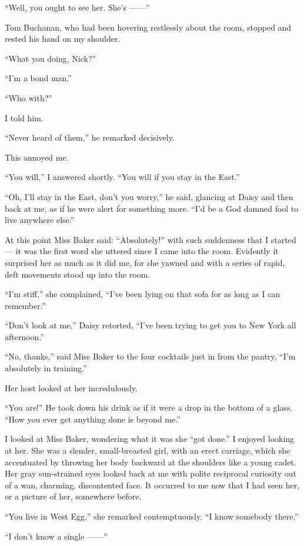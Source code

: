 \documentclass{znotebook}
\begin{document}
``Well, you ought to see her. She’s ——''

Tom Buchanan, who had been hovering restlessly about the room, stopped and rested his hand on my shoulder.

``What you doing, Nick?''

``I’m a bond man.''

``Who with?''

I told him.

``Never heard of them,'' he remarked decisively.

This annoyed me.

``You will,'' I answered shortly. ``You will if you stay in the East.''

``Oh, I’ll stay in the East, don’t you worry,'' he said, glancing at Daisy and then back at me, as if he were alert for something more. ``I’d be a God damned fool to live anywhere else.''

At this point Miss Baker said: ``Absolutely!'' with such suddenness that I started — it was the first word she uttered since I came into the room. Evidently it surprised her as much as it did me, for she yawned and with a series of rapid, deft movements stood up into the room.

``I’m stiff,'' she complained, ``I’ve been lying on that sofa for as long as I can remember.''

``Don’t look at me,'' Daisy retorted, ``I’ve been trying to get you to New York all afternoon.''

``No, thanks,'' said Miss Baker to the four cocktails just in from the pantry, ``I’m absolutely in training.''

Her host looked at her incredulously.

``You are!'' He took down his drink as if it were a drop in the bottom of a glass. ``How you ever get anything done is beyond me.''

I looked at Miss Baker, wondering what it was she ``got done.'' I enjoyed looking at her. She was a slender, small-breasted girl, with an erect carriage, which she accentuated by throwing her body backward at the shoulders like a young cadet. Her gray sun-strained eyes looked back at me with polite reciprocal curiosity out of a wan, charming, discontented face. It occurred to me now that I had seen her, or a picture of her, somewhere before.

``You live in West Egg,'' she remarked contemptuously. ``I know somebody there.''

``I don’t know a single ——''
\end{document}
